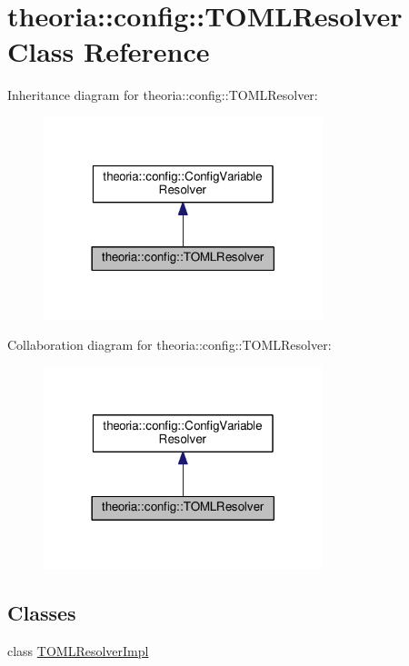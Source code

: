 \hypertarget{classtheoria_1_1config_1_1TOMLResolver}{\section{theoria\+:\+:config\+:\+:T\+O\+M\+L\+Resolver Class Reference}
\label{classtheoria_1_1config_1_1TOMLResolver}
}


Inheritance diagram for theoria\+:\+:config\+:\+:T\+O\+M\+L\+Resolver\+:
\nopagebreak
\begin{figure}[H]
\begin{center}
\leavevmode
\includegraphics[width=230pt]{classtheoria_1_1config_1_1TOMLResolver__inherit__graph}
\end{center}
\end{figure}


Collaboration diagram for theoria\+:\+:config\+:\+:T\+O\+M\+L\+Resolver\+:
\nopagebreak
\begin{figure}[H]
\begin{center}
\leavevmode
\includegraphics[width=230pt]{classtheoria_1_1config_1_1TOMLResolver__coll__graph}
\end{center}
\end{figure}
\subsection*{Classes}
\begin{DoxyCompactItemize}
\item 
class \hyperlink{classTOMLResolver_1_1TOMLResolverImpl}{T\+O\+M\+L\+Resolver\+Impl}
\end{DoxyCompactItemize}
